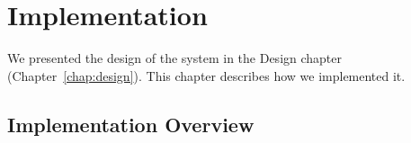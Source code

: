 
\chapter{Implementation}
\label{chap:implementation}


We presented the design of the system in the Design chapter
(Chapter~\ref{chap:design}).  This chapter describes how we
implemented it. 



\section{Implementation Overview}
\label{sec:implementsteps}




